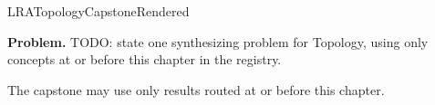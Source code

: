 \ifcsname LRATopologyCapstoneRendered\endcsname
\else
\expandafter\gdef\csname LRATopologyCapstoneRendered\endcsname{}

\newpage
{}
\label{cap:topology}

\begin{tcolorbox}[
  colback=gray!6,
  colframe=gray!40,
  arc=2pt,
  left=8pt, right=8pt, top=6pt, bottom=6pt,
  title={\small\textbf{Capstone Problem}},
  fonttitle=\small\bfseries
]
\textbf{Problem.}
TODO: state one synthesizing problem for Topology, using only concepts at or
before this chapter in the registry.
\end{tcolorbox}

\begin{remark*}
The capstone may use only results routed at or before this chapter.
\end{remark*}

\clearpage
\fi
